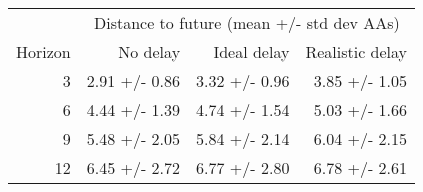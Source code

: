 
\begin{tabular*}{0.7\textwidth}{rrrr}
\toprule
          & \multicolumn{3}{c}{Distance to future (mean +/- std dev AAs)} \\
  Horizon & No delay & Ideal delay & Realistic delay \\
\midrule

3 & 2.91 +/- 0.86 & 3.32 +/- 0.96 & 3.85 +/- 1.05 \\
6 & 4.44 +/- 1.39 & 4.74 +/- 1.54 & 5.03 +/- 1.66 \\
9 & 5.48 +/- 2.05 & 5.84 +/- 2.14 & 6.04 +/- 2.15 \\
12 & 6.45 +/- 2.72 & 6.77 +/- 2.80 & 6.78 +/- 2.61 \\

\bottomrule
\end{tabular*}

